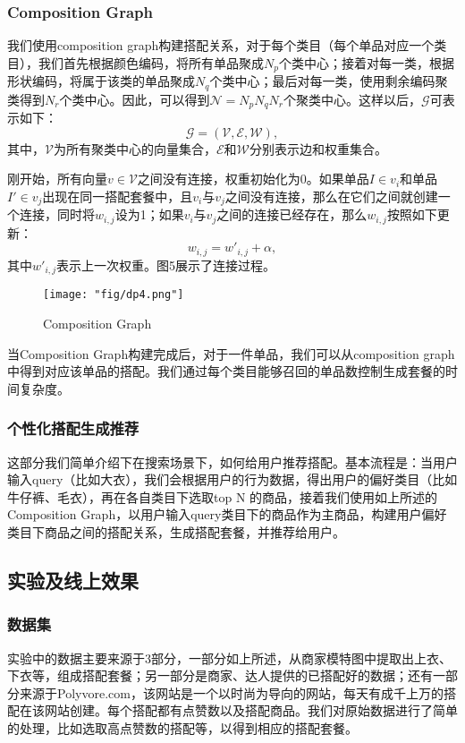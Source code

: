 \subsubsection{Composition Graph}
我们使用composition graph构建搭配关系，对于每个类目（每个单品对应一个类目），我们首先根据颜色编码，将所有单品聚成$N_{p}$个类中心；接着对每一类，根据形状编码，将属于该类的单品聚成$N_{q}$个类中心；最后对每一类，使用剩余编码聚类得到$N_{r}$个类中心。因此，可以得到$\mathcal{N} = N_{p}N_{q}N_{r}$个聚类中心。这样以后，$\mathcal{G} $可表示如下：
\begin{equation}
\mathcal{G}= (\mathcal{V},\mathcal{E},\mathcal{W}),
\end{equation}
其中，$\mathcal{V}$为所有聚类中心的向量集合，$\mathcal{E}$和$\mathcal{W}$分别表示边和权重集合。

刚开始，所有向量$v\in\mathcal{V}$之间没有连接，权重初始化为0。如果单品$I \in v_{i}$和单品$I' \in v_{j}$出现在同一搭配套餐中，且$v_{i}$与$v_{j}$之间没有连接，那么在它们之间就创建一个连接，同时将$w_{i,j}$设为1；如果$v_{i}$与$v_{j}$之间的连接已经存在，那么$w_{i,j}$按照如下更新：
\begin{equation}
w_{i,j} = w'_{i,j} + \alpha,
\end{equation}
其中$w'_{i,j}$表示上一次权重。图5展示了连接过程。

\begin{figure}[!h]
	\centering
	\texttt{[image: "fig/dp4.png"]}
	\caption{Composition Graph}
	\label{fig:dp4}
\end{figure}


当Composition Graph构建完成后，对于一件单品，我们可以从composition graph中得到对应该单品的搭配。我们通过每个类目能够召回的单品数控制生成套餐的时间复杂度。

\subsubsection{个性化搭配生成推荐}
这部分我们简单介绍下在搜索场景下，如何给用户推荐搭配。基本流程是：当用户输入query（比如大衣），我们会根据用户的行为数据，得出用户的偏好类目（比如牛仔裤、毛衣），再在各自类目下选取top N 的商品，接着我们使用如上所述的Composition Graph，以用户输入query类目下的商品作为主商品，构建用户偏好类目下商品之间的搭配关系，生成搭配套餐，并推荐给用户。


\subsection{实验及线上效果}
\subsubsection{数据集}
实验中的数据主要来源于3部分，一部分如上所述，从商家模特图中提取出上衣、下衣等，组成搭配套餐；另一部分是商家、达人提供的已搭配好的数据；还有一部分来源于Polyvore.com，该网站是一个以时尚为导向的网站，每天有成千上万的搭配在该网站创建。每个搭配都有点赞数以及搭配商品。我们对原始数据进行了简单的处理，比如选取高点赞数的搭配等，以得到相应的搭配套餐。

